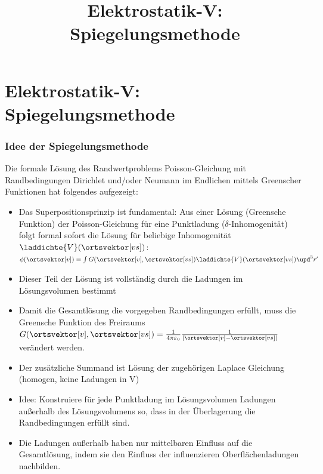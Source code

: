 

\title[TET: Elektrostatik-V: Spiegelungsmethode]{Elektrostatik-V: Spiegelungsmethode}


% 
% 

\maketitle

% 
% 
\section{Elektrostatik-V: Spiegelungsmethode}

\begin{frame}

  \frametitle{Idee der Spiegelungsmethode}
  Die \alert{formale Lösung} des Randwertproblems
  \alert{Poisson-Gleichung} mit Randbedingungen \alert{Dirichlet
    und/oder Neumann} im Endlichen mittels \alert{Greenscher Funktionen} hat folgendes aufgezeigt:
  \begin{itemize}[<+->]
    \item Das \alert{Superpositionsprinzip} ist fundamental: Aus einer
      Lösung (Greensche Funktion) der Poisson-Gleichung für eine \alert{Punktladung} ($\delta$-Inhomogenität) folgt formal sofort
      die Lösung für beliebige Inhomogenität $\laddichte{V}(\ortsvektor[vs])$: $\phi (\ortsvektor[v]) = \int
      G (\ortsvektor[v],\ortsvektor[vs]) \laddichte{V}(\ortsvektor[vs]) \upd^3r'$
      \item Dieser Teil der Lösung ist vollständig durch \alert{die Ladungen
        im Lösungsvolumen} bestimmt
        \item Damit die Gesamtlösung die vorgegeben Randbedingungen
          erfüllt, muss die \alert{Greensche Funktion des Freiraums} $G (\ortsvektor[v],\ortsvektor[vs]) = \frac{1}{4\pi\varepsilon_0} \frac{1}{|\ortsvektor[v]-\ortsvektor[vs]|}$ verändert
          werden.
          \item Der zusätzliche Summand ist Lösung der zugehörigen
            \alert{Laplace Gleichung} (homogen, \alert{keine Ladungen
              in V})
              \item \alert{Idee:} Konstruiere für jede Punktladung im
                Lösungsvolumen Ladungen \alert{außerhalb} des
                Lösungsvolumens so, dass in der Überlagerung die
                Randbedingungen erfüllt sind.
                \item Die Ladungen außerhalb haben nur mittelbaren
                  Einfluss auf die Gesamtlösung, indem sie
                  den Einfluss der \alert{influenzieren Oberflächenladungen} nachbilden.
    \end{itemize}

  
  \end{frame}

